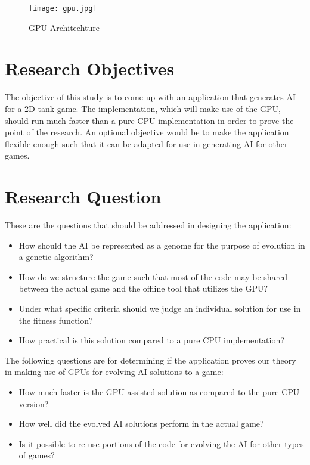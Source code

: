 \begin{figure}
	\centering
		\graphicspath{{/home/bakaplayer/thesis/images/}}
		\texttt{[image: gpu.jpg]}
	\caption{GPU Architechture}
	\cite{pdf:NVCudaPrgGuide}
	\label{fig:gpu_diagram}
\end{figure}

\section{Research Objectives}

The objective of this study is to come up with an application that generates AI for
a 2D tank game. The implementation, which will make use of the GPU, should run
much faster than a pure CPU implementation in order to prove the point of the research.
An optional objective would be to make the application flexible enough such that it
can be adapted for use in generating AI for other games.

\section{Research Question}

These are the questions that should be addressed in designing the application:

\begin{itemize}
 \item How should the AI be represented as a genome for the purpose of evolution in a genetic algorithm?

 \item How do we structure the game such that most of the code may be shared between
the actual game and the offline tool that utilizes the GPU?

 \item Under what specific criteria should we judge an individual solution for use in the
fitness function?

 \item How practical is this solution compared to a pure CPU implementation?
\end{itemize}


The following questions are for determining if the application proves our theory
in making use of GPUs for evolving AI solutions to a game:

\begin{itemize}
 \item How much faster is the GPU assisted solution as compared to the pure CPU
 version?
 
 \item How well did the evolved AI solutions perform in the actual game?
 
 \item Is it possible to re-use portions of the code for evolving the AI for other
 types of games?
\end{itemize}

